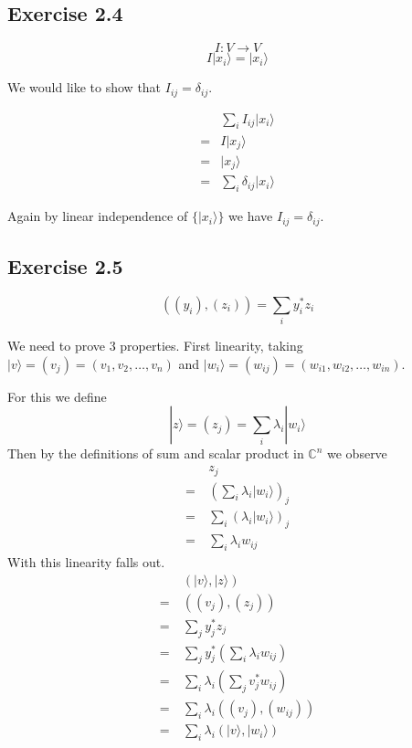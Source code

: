 \documentclass[]{article}
\newcommand{\ket}[1]{| #1 \rangle}
\begin{document}
\subsection{Exercise 2.4}

\[I: V \to V\]
\[I\ket{x_i} = \ket{x_i}\]

We would like to show that $I_{ij} = \delta_{ij}$.

\begin{align*}
	&\sum_i I_{ij} \ket{x_i} \\
	= &I\ket{x_j} \\
	= &\ket{x_j} \\
	= &\sum_i \delta_{ij}\ket{x_i}
\end{align*}

Again by linear independence of $\{\ket{x_i}\}$ we have $I_{ij} = \delta_{ij}$.

\subsection{Exercise 2.5}

\[((y_i), (z_i)) = \sum_i y_i^*z_i\]

We need to prove 3 properties. First linearity, taking $\ket{v} = (v_j) = (v_1,
v_2, \ldots, v_n)$ and $\ket{w_i} = (w_{ij}) = (w_{i1}, w_{i2}, \ldots, w_{in})$.

For this we define
\[\ket{z} = (z_j) = \sum_i\lambda_i\ket{w_i}\]
Then by the definitions of sum and scalar product in $\mathbb{C}^n$ we observe
\begin{align*}
&z_j \\
	=\ &{\left(\sum_i\lambda_i\ket{w_i}\right)}_j \\
	=\ &\sum_i{\left(\lambda_i\ket{w_i}\right)}_j \\
	=\ &\sum_i\lambda_i w_{ij}
\end{align*}
With this linearity falls out.
\begin{align*}
	&\left(\ket{v}, \ket{z}\right) \\
=\ &\left((v_j), (z_j)\right) \\
=\ &\sum_j y_j^*z_j \\
=\ &\sum_j y_j^*\left(\sum_i\lambda_i w_{ij}\right) \\
=\ &\sum_i\lambda_i\left(\sum_j v_j^*w_{ij}\right) \\
=\ &\sum_i\lambda_i\left((v_j), (w_{ij})\right) \\
	=\ &\sum_i\lambda_i\left(\ket{v}, \ket{w_i}\right)
\end{align*}
\end{document}
